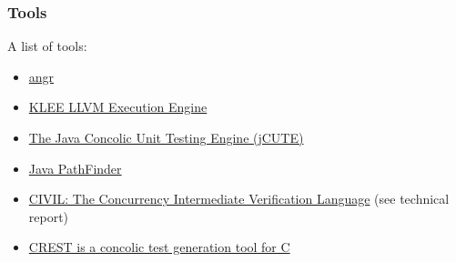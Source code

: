 \documentclass[10pt, a4paper]{article}
\begin{document}
\subsubsection{Tools}
A list of tools:
\begin{itemize}
  \item \href{http://angr.io/}{angr}
  \item \href{https://klee.github.io/}{KLEE LLVM Execution Engine}
  \item \href{https://github.com/osl/jcute}{The Java Concolic Unit Testing Engine (jCUTE)}
  \item \href{http://babelfish.arc.nasa.gov/trac/jpf}{Java PathFinder}
  \item \href{http://vsl.cis.udel.edu/civl/}{CIVIL: The Concurrency Intermediate Verification Language} (see technical report)
  \item \href{https://github.com/jburnim/crest}{CREST is a concolic test generation tool for C}
\end{itemize}


\end{document}

